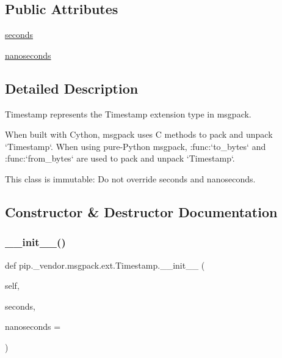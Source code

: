 \subsection*{Public Attributes}
\begin{DoxyCompactItemize}
\item 
\hyperlink{classpip_1_1__vendor_1_1msgpack_1_1ext_1_1Timestamp_a402dde70e5dd6bfc4d783bb780a00c8f}{seconds}
\item 
\hyperlink{classpip_1_1__vendor_1_1msgpack_1_1ext_1_1Timestamp_a6445f24723dbb45fb5f6f7e527acf222}{nanoseconds}
\end{DoxyCompactItemize}


\subsection{Detailed Description}
\begin{DoxyVerb}Timestamp represents the Timestamp extension type in msgpack.

When built with Cython, msgpack uses C methods to pack and unpack `Timestamp`. When using pure-Python
msgpack, :func:`to_bytes` and :func:`from_bytes` are used to pack and unpack `Timestamp`.

This class is immutable: Do not override seconds and nanoseconds.
\end{DoxyVerb}
 

\subsection{Constructor \& Destructor Documentation}
\mbox{\label{classpip_1_1__vendor_1_1msgpack_1_1ext_1_1Timestamp_ad71f01eebb6008ee9b7c7998207c6049}} 
\subsubsection{\texorpdfstring{\+\_\+\+\_\+init\+\_\+\+\_\+()}{\_\_init\_\_()}}
{\footnotesize\ttfamily def pip.\+\_\+vendor.\+msgpack.\+ext.\+Timestamp.\+\_\+\+\_\+init\+\_\+\+\_\+ (\begin{DoxyParamCaption}\item[{}]{self,  }\item[{}]{seconds,  }\item[{}]{nanoseconds = {} }\end{DoxyParamCaption})}

